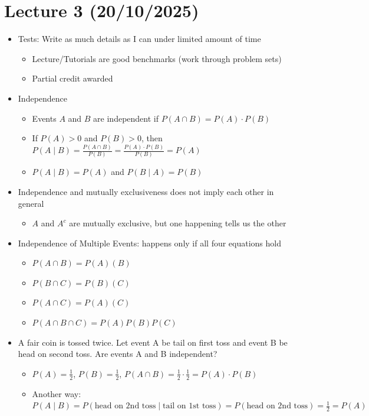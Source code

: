 \documentclass{article}
\begin{document}
\section{Lecture 3 (20/10/2025)}
\begin{itemize}
    \item Tests: Write as much details as I can under limited amount of time
    \begin{itemize}
        \item Lecture/Tutorials are good benchmarks (work through problem sets)
        \item Partial credit awarded
    \end{itemize}
    \item Independence
	\begin{itemize}
		\item Events $A$ and $B$ are independent if $P(A \cap B) = P(A) \cdot P(B)$
		\item If $P(A) > 0$ and $P(B) > 0$, then $P(A \mid B) = \frac{P(A \cap B)}{P(B)} = \frac{P(A) \cdot P(B)}{P(B)} = P(A)$
		\item $P(A \mid B) = P(A)$ and $P(B \mid A) = P(B)$
	\end{itemize}
    \item Independence and mutually exclusiveness does not imply each other in general
    \begin{itemize}
        \item $A$ and $A^c$ are mutually exclusive, but one happening tells us the other
    \end{itemize}
    \item Independence of Multiple Events: happens only if all four equations hold
    \begin{itemize}
        \item $P(A \cap B) = P(A)(B)$
        \item $P(B \cap C) = P(B)(C)$
        \item $P(A \cap C) = P(A)(C)$
        \item $P(A \cap B \cap C) = P(A)P(B)P(C)$
    \end{itemize}
    \item A fair coin is tossed twice. Let event A be tail on first toss and event B be head on second toss. Are events A and B independent?
    \begin{itemize}
        \item $P(A) = \frac{1}{2}$, $P(B) = \frac{1}{2}$, $P(A \cap B) = \frac{1}{2} \cdot \frac{1}{2} = P(A) \cdot P(B)$
        \item Another way: $P(A \mid B) = P(\text{head on 2nd toss} \mid \text{tail on 1st toss}) = P(\text{head on 2nd toss}) = \frac{1}{2} = P(A)$

\end{itemize}
\end{itemize}
\end{document}
